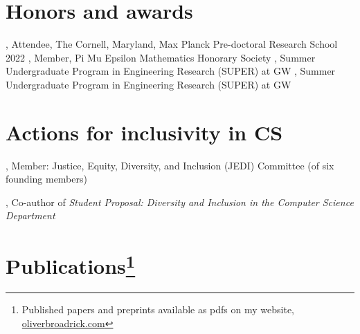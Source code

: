 \documentclass[letterpaper]{article}
\renewenvironment{itemize}{
  \begin{list}{}{
    \setlength{\leftmargin}{1.5em}
  }
}{
  \end{list}
}
\begin{document}
\section*{Honors and awards}

, Attendee, The Cornell, Maryland, Max Planck Pre-doctoral Research School 2022
, Member, Pi Mu Epsilon Mathematics Honorary Society
, Summer Undergraduate Program in Engineering Research (SUPER) at GW
, Summer Undergraduate Program in Engineering Research (SUPER) at GW


\section*{Actions for inclusivity in CS}
, Member: Justice, Equity, Diversity, and Inclusion (JEDI) Committee (of six founding members)

, Co-author of \emph{Student Proposal: Diversity and Inclusion in the Computer Science Department} 

\section*{Publications\footnote{Published papers and preprints available as pdfs on my website, \href{oliverbroadrick.com}{oliverbroadrick.com}}}
\end{document}
